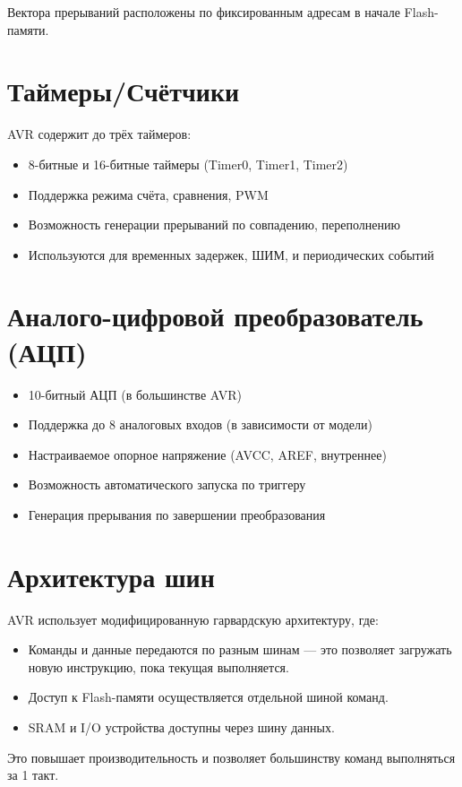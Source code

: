 \documentclass[a4paper,12pt]{article}
\begin{document}
Вектора прерываний расположены по фиксированным адресам в начале Flash-памяти.

\section{Таймеры/Счётчики}
AVR содержит до трёх таймеров:
\begin{itemize}
    \item 8-битные и 16-битные таймеры (Timer0, Timer1, Timer2)
    \item Поддержка режима счёта, сравнения, PWM
    \item Возможность генерации прерываний по совпадению, переполнению
    \item Используются для временных задержек, ШИМ, и периодических событий
\end{itemize}

\section{Аналого-цифровой преобразователь (АЦП)}
\begin{itemize}
    \item 10-битный АЦП (в большинстве AVR)
    \item Поддержка до 8 аналоговых входов (в зависимости от модели)
    \item Настраиваемое опорное напряжение (AVCC, AREF, внутреннее)
    \item Возможность автоматического запуска по триггеру
    \item Генерация прерывания по завершении преобразования
\end{itemize}

\section{Архитектура шин}
AVR использует модифицированную гарвардскую архитектуру, где:
\begin{itemize}
    \item Команды и данные передаются по разным шинам — это позволяет загружать новую инструкцию, пока текущая выполняется.
    \item Доступ к Flash-памяти осуществляется отдельной шиной команд.
    \item SRAM и I/O устройства доступны через шину данных.
\end{itemize}
Это повышает производительность и позволяет большинству команд выполняться за 1 такт.
\end{document}
